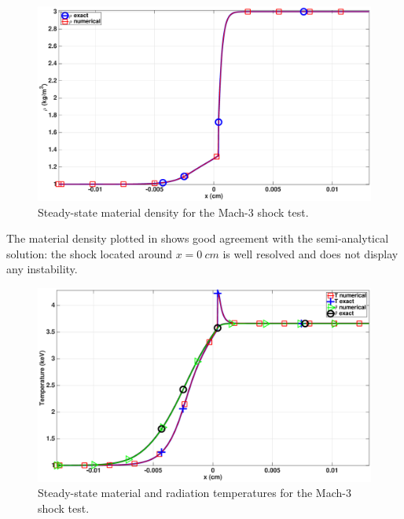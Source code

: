 \documentclass[times,doublespace]{fldauth}%
\begin{document}
\begin{figure}[H]
    \centering
    \includegraphics[width=\textwidth]{figures/cst-xs/mach_3_cst_xs_nel_1000_density.eps}
    \caption{Steady-state material density for the Mach-3 shock test.}\label{fig:mach-3-cst-xs-dens}
\end{figure}
%
The material density plotted in  shows good agreement with the semi-analytical solution: the shock located around $x=0 \ cm$ is well resolved and does not display any instability. \\
%
\begin{figure}[H]
    \centering
    \includegraphics[width=\textwidth]{figures/cst-xs/mach_3_cst_xs_nel_1000_temperature.eps}
    \caption{Steady-state material and radiation temperatures for the Mach-3 shock test.}\label{fig:mach-3-cst-xs-temp}
\end{figure}
\end{document}
